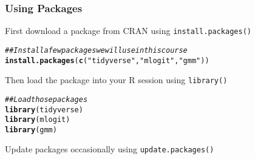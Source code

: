 \documentclass{beamer}\usepackage[]{graphicx}\usepackage[]{color}
\makeatletter
\newcommand{\hlstr}[1]{\textcolor[rgb]{0.192,0.494,0.8}{#1}}%
\newcommand{\hlcom}[1]{\textcolor[rgb]{0.678,0.584,0.686}{\textit{#1}}}%
\newcommand{\hlstd}[1]{\textcolor[rgb]{0.345,0.345,0.345}{#1}}%
\newcommand{\hlkwd}[1]{\textcolor[rgb]{0.737,0.353,0.396}{\textbf{#1}}}%
\newenvironment{kframe}{%
 \def\at@end@of@kframe{}%
 \ifinner\ifhmode%
  \def\at@end@of@kframe{\end{minipage}}%
  \begin{minipage}{\columnwidth}%
 \fi\fi%
 \def\FrameCommand##1{\hskip\@totalleftmargin \hskip-\fboxsep
 \colorbox{shadecolor}{##1}\hskip-\fboxsep
     \hskip-\linewidth \hskip-\@totalleftmargin \hskip\columnwidth}%
 \MakeFramed {\advance\hsize-\width
   \@totalleftmargin\z@ \linewidth\hsize
   \@setminipage}}%
 {\par\unskip\endMakeFramed%
 \at@end@of@kframe}
\newenvironment{knitrout}{}{} %
\makeatother
\begin{document}
\begin{frame}[fragile]\frametitle{Using Packages}
    First download a package from CRAN using \texttt{install.packages()}
\begin{knitrout}\footnotesize
{}\color{fgcolor}\begin{kframe}
\begin{alltt}
\hlcom{## Install a few packages we will use in this course}
\hlkwd{install.packages}\hlstd{(}\hlkwd{c}\hlstd{(}\hlstr{"tidyverse"}\hlstd{,} \hlstr{"mlogit"}\hlstd{,} \hlstr{"gmm"}\hlstd{))}
\end{alltt}
\end{kframe}
\end{knitrout}
    \vspace{3ex}
    Then load the package into your R session using \texttt{library()}
\begin{knitrout}\footnotesize
{}\color{fgcolor}\begin{kframe}
\begin{alltt}
\hlcom{## Load those packages}
\hlkwd{library}\hlstd{(tidyverse)}
\hlkwd{library}\hlstd{(mlogit)}
\hlkwd{library}\hlstd{(gmm)}
\end{alltt}
\end{kframe}
\end{knitrout}
    \vspace{3ex}
    Update packages occasionally using \texttt{update.packages()}
\end{frame}
\end{document}

